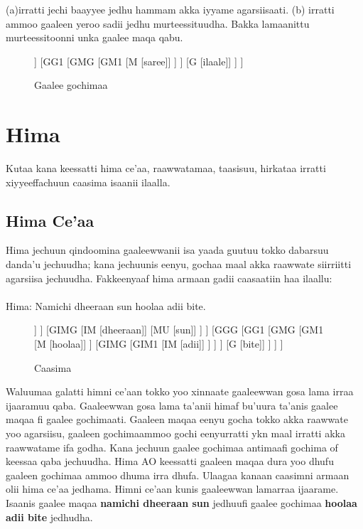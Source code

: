 \documentclass[11pt,b5paper]{book}
\begin{document}
(a)irratti jechi baayyee jedhu hammam akka iyyame agarsiisaati. (b) irratti ammoo gaaleen yeroo sadii jedhu
murteessituudha. Bakka lamaanittu murteessitoonni unka gaalee maqa qabu. 

\begin{figure}[H]										
	\caption{Gaalee gochimaa}
	\centering
	\begin{forest}
		[GGG
			[MU [yeroo sadii]]
			[GG1
				[GMG
					[GM1
						[M [saree]]
					]
				]
				[G [ilaale]]
			]
		]
	\end{forest}
\end{figure}

\section{Hima}
Kutaa kana keessatti hima ce’aa, raawwatamaa, taasisuu, hirkataa irratti xiyyeeffachuun caasima isaanii ilaalla. 

\subsection{Hima Ce'aa}
Hima jechuun qindoomina gaaleewwanii isa yaada guutuu tokko dabarsuu danda’u jechuudha; kana jechuunis eenyu, gochaa maal akka raawwate siirriitti agarsiisa jechuudha. Fakkeenyaaf hima armaan gadii caasaatiin haa ilaallu:\\
\\
Hima: Namichi dheeraan sun hoolaa adii bite. 

\begin{figure}[H]										
	\caption{Caasima}
	\centering
	\begin{forest}
		[H
			[GMG
				[GM1
					[M [Namichi]]
				]
				[GIMG
					[IM [dheeraan]]
					[MU [sun]]
				]
			]
			[GGG
				[GG1
					[GMG
						[GM1
							[M [hoolaa]]
						]
						[GIMG
							[GIM1
								[IM [adii]]
							]
						]
					]
					[G [bite]]
				]
			]		
		]
	\end{forest}
\end{figure}

Waluumaa galatti himni ce'aan tokko yoo xinnaate gaaleewwan gosa lama irraa ijaaramuu qaba. Gaaleewwan gosa lama ta’anii himaf bu’uura ta’anis gaalee maqaa fi gaalee gochimaati. Gaaleen maqaa eenyu gocha tokko akka raawwate yoo
agarsiisu, gaaleen gochimaammoo gochi eenyurratti ykn maal irratti akka raawwatame ifa godha. Kana jechuun gaalee gochimaa antimaafi gochima of keessaa qaba jechuudha. Hima AO keessatti gaaleen maqaa dura yoo dhufu gaaleen gochimaa ammoo dhuma irra dhufa. Ulaagaa kanaan caasimni armaan olii hima ce'aa jedhama. Himni ce'aan kunis gaaleewwan lamarraa ijaarame. Isaanis gaalee maqaa \textbf{namichi dheeraan sun }jedhuufi gaalee gochimaa \textbf{hoolaa adii bite} jedhudha. 
\end{document}
